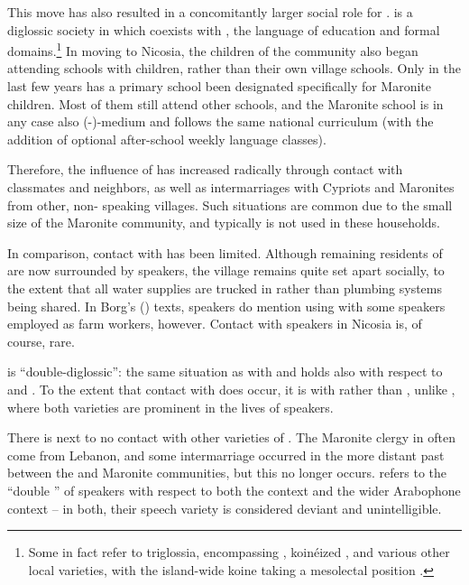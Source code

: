 \documentclass[output=paper]{langsci/langscibook}
\begin{document}
This move has also resulted in a concomitantly larger social role for  .  is a diglossic society in which   coexists with  , the language of education and formal domains.\footnote{Some in fact refer to triglossia, encompassing  , koinéized  , and various other local varieties, with the island-wide koine taking a mesolectal position \citep{Arvaniti2010}.} In moving to Nicosia, the children of the community also began attending schools with   children, rather than their own village schools. Only in the last few years has a primary school been designated specifically for Maronite children. Most of them still attend other schools, and the Maronite school is in any case also (-)-medium and follows the same national curriculum (with the addition of optional after-school weekly  language classes).

Therefore, the influence of  has increased radically through contact with  classmates and neighbors, as well as intermarriages with  Cypriots and Maronites from other, non- speaking villages. Such situations are common due to the small size of the Maronite community, and typically  is not used in these households.


In comparison, contact with  has been limited. Although remaining residents of  are now surrounded by  speakers, the village remains quite set apart socially, to the extent that all water supplies are trucked in rather than plumbing systems being shared. In Borg's (\citeyear{Borg1985}) texts, speakers do mention using  with some speakers employed as farm workers, however. Contact with  speakers in Nicosia is, of course, rare.

 is “double-diglossic”: the same situation as with  and   holds also with respect to  and  . To the extent that contact with  does occur, it is with   rather than  , unlike , where both varieties are prominent in the lives of  speakers.

There is next to no contact with other varieties of . The Maronite clergy in  often come from Lebanon, and some intermarriage occurred in the more distant past between the  and  Maronite communities, but this no longer occurs. \citet{Roth2004} refers to the “double ” of  speakers with respect to both the  context and the wider Arabophone context – in both, their speech variety is considered deviant and unintelligible.
\end{document}
